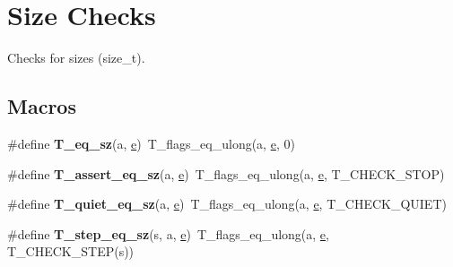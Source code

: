 \hypertarget{group__RTEMSTestFrameworkChecksSZ}{}\section{Size Checks}
\label{group__RTEMSTestFrameworkChecksSZ}


Checks for sizes (size\+\_\+t).  


\subsection*{Macros}
\begin{DoxyCompactItemize}
\item 
\mbox{\label{group__RTEMSTestFrameworkChecksSZ_ga6eb73998f6c6e1ac8de5ec9aac4a4f79}} 
\#define {\bfseries T\+\_\+eq\+\_\+sz}(a,  \mbox{\hyperlink{sun4u_2tte_8h_a8b0b9ed08e0e18920ec2682f48228c27}{e}})~T\+\_\+flags\+\_\+eq\+\_\+ulong(a, \mbox{\hyperlink{sun4u_2tte_8h_a8b0b9ed08e0e18920ec2682f48228c27}{e}}, 0)
\item 
\mbox{\label{group__RTEMSTestFrameworkChecksSZ_gaefffe5208f563a1ca31bae14240e301e}} 
\#define {\bfseries T\+\_\+assert\+\_\+eq\+\_\+sz}(a,  \mbox{\hyperlink{sun4u_2tte_8h_a8b0b9ed08e0e18920ec2682f48228c27}{e}})~T\+\_\+flags\+\_\+eq\+\_\+ulong(a, \mbox{\hyperlink{sun4u_2tte_8h_a8b0b9ed08e0e18920ec2682f48228c27}{e}}, T\+\_\+\+C\+H\+E\+C\+K\+\_\+\+S\+T\+OP)
\item 
\mbox{\label{group__RTEMSTestFrameworkChecksSZ_ga671fc9fe07e91b61b40a500b71ba8c5e}} 
\#define {\bfseries T\+\_\+quiet\+\_\+eq\+\_\+sz}(a,  \mbox{\hyperlink{sun4u_2tte_8h_a8b0b9ed08e0e18920ec2682f48228c27}{e}})~T\+\_\+flags\+\_\+eq\+\_\+ulong(a, \mbox{\hyperlink{sun4u_2tte_8h_a8b0b9ed08e0e18920ec2682f48228c27}{e}}, T\+\_\+\+C\+H\+E\+C\+K\+\_\+\+Q\+U\+I\+ET)
\item 
\mbox{\label{group__RTEMSTestFrameworkChecksSZ_gaee225aef7fa5566ed6e57c2827b36858}} 
\#define {\bfseries T\+\_\+step\+\_\+eq\+\_\+sz}(s,  a,  \mbox{\hyperlink{sun4u_2tte_8h_a8b0b9ed08e0e18920ec2682f48228c27}{e}})~T\+\_\+flags\+\_\+eq\+\_\+ulong(a, \mbox{\hyperlink{sun4u_2tte_8h_a8b0b9ed08e0e18920ec2682f48228c27}{e}}, T\+\_\+\+C\+H\+E\+C\+K\+\_\+\+S\+T\+EP(s))
\item 

\end{DoxyCompactItemize}
